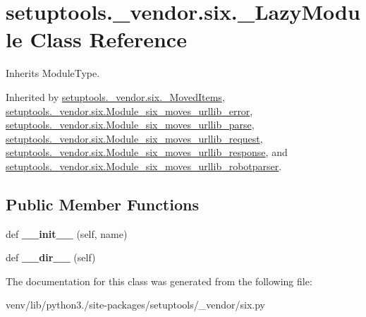 \hypertarget{classsetuptools_1_1__vendor_1_1six_1_1___lazy_module}{}\section{setuptools.\+\_\+vendor.\+six.\+\_\+\+Lazy\+Module Class Reference}
\label{classsetuptools_1_1__vendor_1_1six_1_1___lazy_module}


Inherits Module\+Type.



Inherited by \hyperlink{classsetuptools_1_1__vendor_1_1six_1_1___moved_items}{setuptools.\+\_\+vendor.\+six.\+\_\+\+Moved\+Items}, \hyperlink{classsetuptools_1_1__vendor_1_1six_1_1_module__six__moves__urllib__error}{setuptools.\+\_\+vendor.\+six.\+Module\+\_\+six\+\_\+moves\+\_\+urllib\+\_\+error}, \hyperlink{classsetuptools_1_1__vendor_1_1six_1_1_module__six__moves__urllib__parse}{setuptools.\+\_\+vendor.\+six.\+Module\+\_\+six\+\_\+moves\+\_\+urllib\+\_\+parse}, \hyperlink{classsetuptools_1_1__vendor_1_1six_1_1_module__six__moves__urllib__request}{setuptools.\+\_\+vendor.\+six.\+Module\+\_\+six\+\_\+moves\+\_\+urllib\+\_\+request}, \hyperlink{classsetuptools_1_1__vendor_1_1six_1_1_module__six__moves__urllib__response}{setuptools.\+\_\+vendor.\+six.\+Module\+\_\+six\+\_\+moves\+\_\+urllib\+\_\+response}, and \hyperlink{classsetuptools_1_1__vendor_1_1six_1_1_module__six__moves__urllib__robotparser}{setuptools.\+\_\+vendor.\+six.\+Module\+\_\+six\+\_\+moves\+\_\+urllib\+\_\+robotparser}.

\subsection*{Public Member Functions}
\begin{DoxyCompactItemize}
\item 
\mbox{\label{classsetuptools_1_1__vendor_1_1six_1_1___lazy_module_a04a3fbb58a51b47f8b213cec5050bb57}} 
def {\bfseries \+\_\+\+\_\+init\+\_\+\+\_\+} (self, name)
\item 
\mbox{\label{classsetuptools_1_1__vendor_1_1six_1_1___lazy_module_acc01bffa6823c48ef12fc6b0e8c227dd}} 
def {\bfseries \+\_\+\+\_\+dir\+\_\+\+\_\+} (self)
\end{DoxyCompactItemize}


The documentation for this class was generated from the following file\+:\begin{DoxyCompactItemize}
\item 
venv/lib/python3./site-\/packages/setuptools/\+\_\+vendor/six.\+py\end{DoxyCompactItemize}

